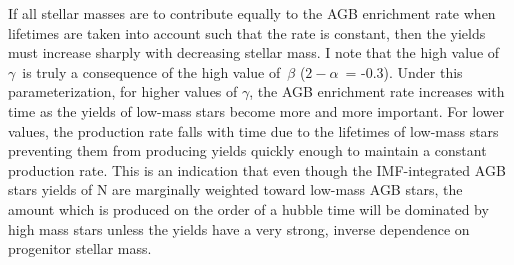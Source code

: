 \documentclass[12pt]{report}
\begin{document}
If all stellar masses are to contribute equally to the AGB enrichment rate when 
lifetimes are taken into account such that the rate is constant, then the 
yields must increase sharply with decreasing stellar mass. I note that the 
high value of~$\gamma$~is truly a consequence of the high value of~$\beta$ 
($2 - \alpha$~= -0.3). Under this parameterization, for higher values of 
$\gamma$, the AGB enrichment rate increases with time as the yields of low-mass 
stars become more and more important. For lower values, the production rate 
falls with time due to the lifetimes of low-mass stars preventing them from 
producing yields quickly enough to maintain a constant production rate. This 
is an indication that even though the IMF-integrated AGB stars yields of N are 
marginally weighted toward low-mass AGB stars, the amount which is produced on 
the order of a hubble time will be dominated by high mass stars unless the 
yields have a very strong, inverse dependence on progenitor stellar mass. 



\newpage 
 
 
\end{document}
